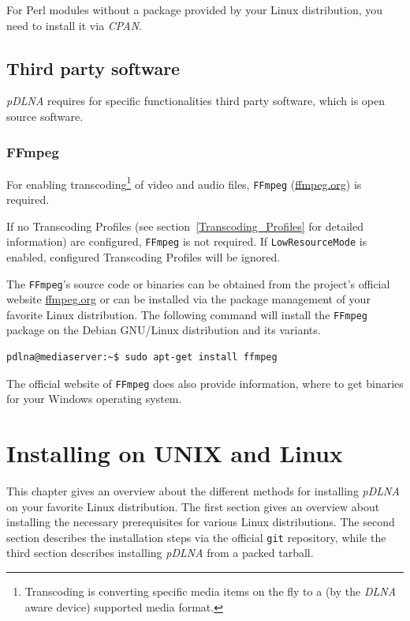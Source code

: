 \documentclass[a4paper,oneside,10pt]{report}
\newenvironment{colframeimportantnote}{%
  \begin{Sbox}
    \begin{minipage}{.99\columnwidth}
}{%
  \end{minipage}
  \end{Sbox}
  \begin{center}
    \fcolorbox{black}{Orange}{\TheSbox}
  \end{center}
}
\begin{document}
For Perl modules without a package provided by your Linux distribution, you need to install it via {\em CPAN}.

\section{Third party software}

{\em pDLNA} requires for specific functionalities third party software, which is open source software.

\subsection{FFmpeg}
\label{ffmpeg}

For enabling transcoding\footnote{Transcoding is converting specific media items on the fly to a (by the {\em DLNA} aware device) supported media format.} of video and audio files, \verb|FFmpeg| (\url{ffmpeg.org}) is required.

\begin{colframeimportantnote}
If no Transcoding Profiles (see section~\ref{Transcoding_Profiles} for detailed information) are configured, \verb|FFmpeg| is not required. If \verb|LowResourceMode| is enabled, configured Transcoding Profiles will be ignored.
\end{colframeimportantnote}

The \verb|FFmpeg|'s source code or binaries can be obtained from the project's official website \url{ffmpeg.org} or can be installed via the package management of your favorite Linux distribution. The following command will install the \verb|FFmpeg| package on the Debian GNU/Linux distribution and its variants.

\begin{lstlisting}
pdlna@mediaserver:~$ sudo apt-get install ffmpeg
\end{lstlisting}

The official website of \verb|FFmpeg| does also provide information, where to get binaries for your Windows operating system.

%
%

\chapter{Installing on UNIX and Linux}
\label{linux}

This chapter gives an overview about the different methods for installing {\em pDLNA} on your favorite Linux distribution. The first section gives an overview about installing the necessary prerequisites for various Linux distributions. The second section describes the installation steps via the official \verb|git| repository, while the third section describes installing {\em pDLNA} from a packed tarball.
\end{document}
